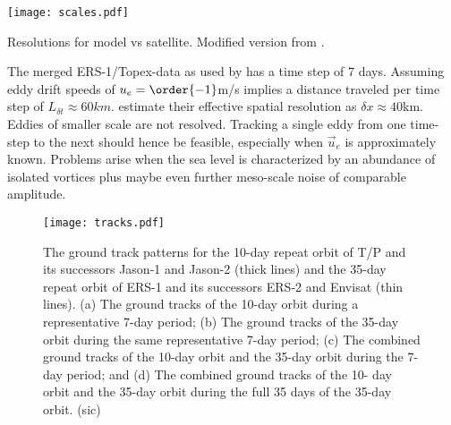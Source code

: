 \begin{marginfigure}
\texttt{[image: scales.pdf]}
\caption{Resolutions for model vs satellite. Modified version from \citet{olbers2012ocean}.}
\end{marginfigure}
The merged ERS-1/Topex-data as used by \citet{Chelton2011} has a time step of 7 days. Assuming eddy drift speeds of $u_e=\order{-1}$m/s implies a distance traveled per time step of $L_{\delta t}\approx 60km$. \citeauthor{Chelton2011} estimate their effective spatial resolution as $\delta x \approx 40$km. Eddies of smaller scale are not resolved. Tracking a single eddy from one time-step to the next should hence be feasible, especially when $\vec{u}_e$ is approximately known. Problems arise when the sea level is characterized by an abundance of isolated vortices plus maybe even further meso-scale noise of comparable amplitude.


\begin{figure}
\texttt{[image: tracks.pdf]}
\caption{{The ground track patterns for the 10-day repeat orbit of T/P and its successors Jason-1 and Jason-2 (thick lines) and the 35-day repeat orbit of ERS-1 and its successors ERS-2 and Envisat (thin lines). (a) The ground tracks of the 10-day orbit during a representative 7-day period; (b) The ground tracks of the 35-day orbit during the same representative 7-day period; (c) The combined ground tracks of the 10-day orbit and the 35-day orbit during the 7-day period; and (d) The combined ground tracks of the 10- day orbit and the 35-day orbit during the full 35 days of the 35-day orbit. (sic)} \citet{Chelton2011}}
\end{figure}





